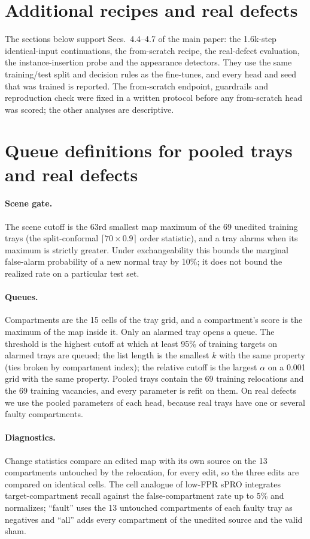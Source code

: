 \section{Additional recipes and real defects}
\label{sec:supp_v2}
The sections below support Secs.~4.4--4.7 of the main paper: the 1.6k-step identical-input continuations, the from-scratch recipe, the real-defect evaluation, the instance-insertion probe and the appearance detectors. They use the same training/test split and decision rules as the fine-tunes, and every head and seed that was trained is reported. The from-scratch endpoint, guardrails and reproduction check were fixed in a written protocol before any from-scratch head was scored; the other analyses are descriptive.

\section{Queue definitions for pooled trays and real defects}
\label{sec:supp_defs}
\paragraph{Scene gate.} The scene cutoff is the 63rd smallest map maximum of the 69 unedited training trays (the split-conformal $\lceil 70\times0.9\rceil$ order statistic), and a tray alarms when its maximum is strictly greater. Under exchangeability this bounds the marginal false-alarm probability of a new normal tray by 10\%; it does not bound the realized rate on a particular test set.
\paragraph{Queues.} Compartments are the 15 cells of the tray grid, and a compartment's score is the maximum of the map inside it. Only an alarmed tray opens a queue. The threshold is the highest cutoff at which at least 95\% of training targets on alarmed trays are queued; the list length is the smallest $k$ with the same property (ties broken by compartment index); the relative cutoff is the largest $\alpha$ on a 0.001 grid with the same property. Pooled trays contain the 69 training relocations and the 69 training vacancies, and every parameter is refit on them. On real defects we use the pooled parameters of each head, because real trays have one or several faulty compartments.
\paragraph{Diagnostics.} Change statistics compare an edited map with its own source on the 13 compartments untouched by the relocation, for every edit, so the three edits are compared on identical cells. The cell analogue of low-FPR sPRO integrates target-compartment recall against the false-compartment rate up to 5\% and normalizes; ``fault'' uses the 13 untouched compartments of each faulty tray as negatives and ``all'' adds every compartment of the unedited source and the valid sham.

